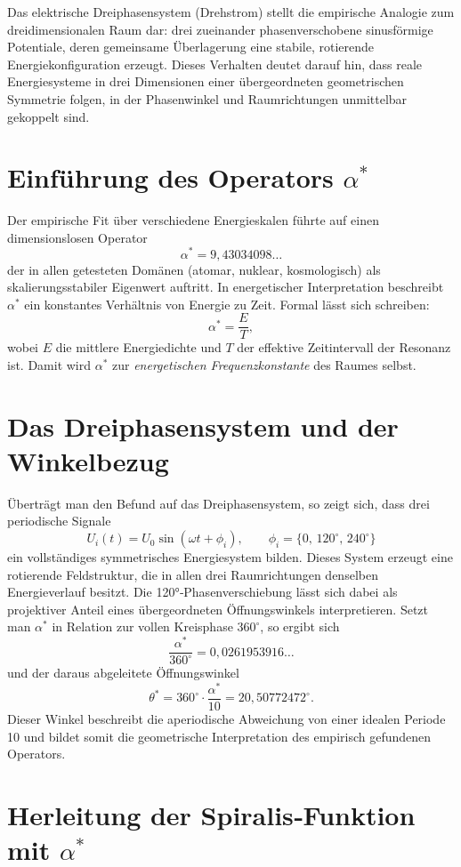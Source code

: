 Das elektrische Dreiphasensystem (Drehstrom)
stellt die empirische Analogie zum dreidimensionalen Raum dar:
drei zueinander phasenverschobene sinusförmige Potentiale,
deren gemeinsame Überlagerung eine stabile, rotierende
Energiekonfiguration erzeugt.
Dieses Verhalten deutet darauf hin, dass reale Energiesysteme
in drei Dimensionen einer übergeordneten geometrischen Symmetrie folgen,
in der Phasenwinkel und Raumrichtungen unmittelbar gekoppelt sind.

\section{Einführung des Operators $\alpha^*$}

Der empirische Fit über verschiedene Energieskalen
führte auf einen dimensionslosen Operator
\[
\alpha^* = 9{,}43034098\dots
\]
der in allen getesteten Domänen (atomar, nuklear, kosmologisch)
als skalierungsstabiler Eigenwert auftritt.
In energetischer Interpretation beschreibt $\alpha^*$
ein konstantes Verhältnis von Energie zu Zeit.
Formal lässt sich schreiben:
\[
\alpha^* = \frac{E}{T},
\]
wobei $E$ die mittlere Energiedichte
und $T$ der effektive Zeitintervall der Resonanz ist.
Damit wird $\alpha^*$ zur \emph{energetischen Frequenzkonstante}
des Raumes selbst.

\section{Das Dreiphasensystem und der Winkelbezug}

Überträgt man den Befund auf das Dreiphasensystem,
so zeigt sich, dass drei periodische Signale
\[
U_i(t) = U_0 \sin(\omega t + \phi_i),
\qquad
\phi_i = \{0,\,120^\circ,\,240^\circ\}
\]
ein vollständiges symmetrisches Energiesystem bilden.
Dieses System erzeugt eine rotierende Feldstruktur,
die in allen drei Raumrichtungen denselben Energieverlauf besitzt.
Die 120°‐Phasenverschiebung lässt sich dabei
als projektiver Anteil eines übergeordneten Öffnungswinkels interpretieren.
Setzt man $\alpha^*$ in Relation zur vollen Kreisphase $360^\circ$,
so ergibt sich
\[
\frac{\alpha^*}{360^\circ} = 0{,}0261953916\dots
\]
und der daraus abgeleitete Öffnungswinkel
\[
\theta^* = 360^\circ \cdot \frac{\alpha^*}{10} = 20{,}50772472^\circ.
\]
Dieser Winkel beschreibt die aperiodische Abweichung
von einer idealen Periode 10
und bildet somit die geometrische Interpretation
des empirisch gefundenen Operators.

\section{Herleitung der Spiralis‐Funktion mit $\alpha^*$}

